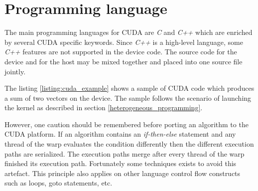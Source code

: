 \documentclass[12pt,oneside]{fithesis2}
\begin{document}
\section{Programming language}

The main programming languages for CUDA are \emph{C} and \emph{C++} which are enriched by several CUDA specific keywords. Since \emph{C++} is a high-level language, some \emph{C++} features are not supported in the device code. The source code for the device and for the host may be mixed together and placed into one source file jointly.~\cite{cuda_guide}

The listing \ref{listing:cuda_example} shows a sample of CUDA code which produces a sum of two vectors on the device. The sample follows the scenario of launching the kernel as described in section \ref{heterogeneous_programming}.

However, one caution should be remembered before porting an algorithm to the CUDA platform. If an algorithm contains an \emph{if-then-else} statement and any thread of the warp evaluates the condition differently then the different execution paths are serialized. The execution paths merge after every thread of the warp finished its execution path. Fortunately some techniques exists to avoid this artefact. This principle also applies on other language control flow constructs such as loops, goto statements, etc.~\cite{cuda_guide}
\end{document}
